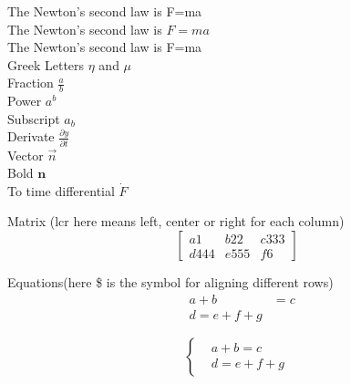 \documentclass[•]{article}
\begin{document}
\begin{flushleft}

The Newton's second law is F=ma\\
The Newton's second law is $F=ma$\\
The Newton's second law is F=ma\\
Greek Letters $\eta$ and $\mu$ \\
Fraction $\frac{a}{b}$ \\
Power $a^b$ \\
Subscript $a_b$ \\
Derivate $\frac{\partial y}{\partial t}$ \\
Vector $\vec{n}$ \\
Bold $\mathbf{n}$ \\
To time differential $\dot {F}$ \\

\end{flushleft}
Matrix (lcr here means left, center or right for each column)
\[
	\left[
		\begin{array}{lcr}
		a1 & b22 & c333 \\
		d444 & e555 & f6
		
		\end{array}
	\right]
\]

Equations(here \$ is the symbol for aligning different rows)
\begin{align}
&a+b&=c\\
&d=e+f+g
\end{align}

\[
	\left\{
	\begin{aligned}
	&a+b=c\\
	&d=e+f+g
	\end{aligned}
	\right.
\]
\end{document}
